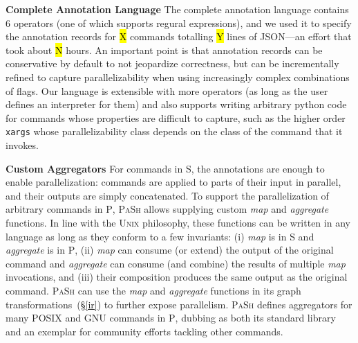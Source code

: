 \documentclass[sigplan, review, screen, anonymous]{acmart}
\newcommand{\heading}[1]{\vspace{4pt}\noindent\textbf{#1}\enspace}
\newcommand{\ttt}[1]{\texttt{#1}}
\newcommand{\cn}[1]{\mbox{\textcircled{\footnotesize #1}}}
\newcommand{\sta}{\cn{\textsc{S}}\xspace}
\newcommand{\pur}{\cn{\textsc{P}}\xspace}
\newcommand{\todo}[1]{\hl{#1}\xspace}
\newcommand{\kk}[1]{[{\color{magenta}kk: #1}]}
\newcommand{\str}{{\color{red}\textbf{\ttt{*}}}}
\newcommand{\sx}[1]{(\S\ref{#1})}
\newcommand{\sys}{{\scshape PaSh}\xspace}
\newcommand{\unix}{{\scshape Unix}\xspace}
\begin{document}
\heading{Complete Annotation Language}
%
The complete annotation language contains 6 operators (one of which supports regural expressions), and we used it to specify the annotation records for \todo{X} commands totalling \todo{Y} lines of JSON---an effort that took about \todo{N} hours. An important point is that annotation records can be conservative by default to not jeopardize correctness, but can be incrementally refined to capture parallelizability when using increasingly complex combinations of flags. Our language is extensible with more operators (as long as the user defines an interpreter for them) and also supports writing arbitrary python code for commands whose properties are difficult to capture, such as the higher order \ttt{xargs} whose parallelizability class depends on the class of the command that it invokes.


\heading{Custom Aggregators}
For commands in \sta, the annotations are enough to enable parallelization:
  commands are applied to parts of their input in parallel, and their outputs are simply concatenated.
%
To support the parallelization of arbitrary commands in \pur, \sys allows supplying custom \emph{map} and \emph{aggregate} functions.
In line with the \unix philosophy, these functions can be written in any language as long as they conform to a few invariants:
  (i) \emph{map} is in \sta and \emph{aggregate} is in \pur,
  (ii) \emph{map} can consume (or extend) the output of the original command and  \emph{aggregate} can consume (and combine) the results of multiple \emph{map} invocations, and
  (iii) their composition produces the same output as the original command.
\sys can use the \emph{map} and \emph{aggregate} functions in its graph transformations~\sx{ir} to further expose parallelism.
\sys defines aggregators for many POSIX and GNU commands in \pur, dubbing as both its standard library and an exemplar for community efforts tackling other commands.
\end{document}
